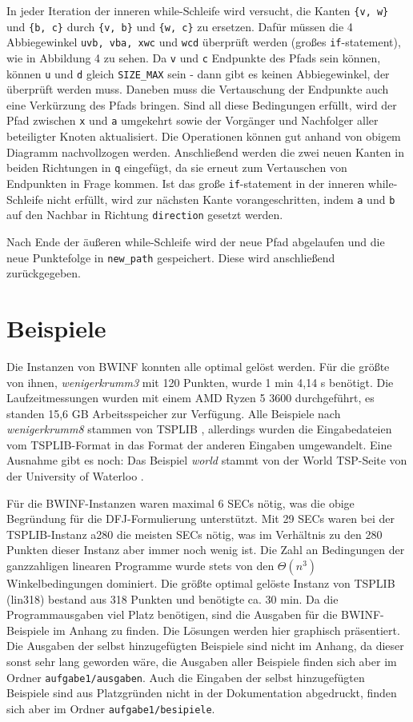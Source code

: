 \documentclass[a4paper, 10pt, ngerman]{article}
\begin{document}
In jeder Iteration der inneren while-Schleife wird versucht, die Kanten \verb|{v, w}| und \verb|{b, c}| durch \verb|{v, b}| und \verb|{w, c}| zu ersetzen. Dafür müssen die 4 Abbiegewinkel \verb|uvb, vba, xwc| und \verb|wcd| überprüft werden (großes \verb|if|-statement), wie in Abbildung 4 zu sehen. Da \verb|v| und \verb|c| Endpunkte des Pfads sein können, können \verb|u| und \verb|d| gleich \verb|SIZE_MAX| sein - dann gibt es keinen Abbiegewinkel, der überprüft werden muss. Daneben muss die Vertauschung der Endpunkte auch eine Verkürzung des Pfads bringen. Sind all diese Bedingungen erfüllt, wird der Pfad zwischen \verb|x| und \verb|a| umgekehrt sowie der Vorgänger und Nachfolger aller beteiligter Knoten aktualisiert. Die Operationen können gut anhand von obigem Diagramm nachvollzogen werden. Anschließend werden die zwei neuen Kanten in beiden Richtungen in \verb|q| eingefügt, da sie erneut zum Vertauschen von Endpunkten in Frage kommen. Ist das große \verb|if|-statement in der inneren while-Schleife nicht erfüllt, wird zur nächsten Kante vorangeschritten, indem \verb|a| und \verb|b| auf den Nachbar in Richtung \verb|direction| gesetzt werden.

Nach Ende der äußeren while-Schleife wird der neue Pfad abgelaufen und die neue Punktefolge in \verb|new_path| gespeichert. Diese wird anschließend zurückgegeben.

\section{Beispiele}

Die Instanzen von BWINF konnten alle optimal gelöst werden. Für die größte von ihnen, \emph{wenigerkrumm3} mit 120 Punkten, wurde 1 min 4,14 s benötigt. Die Laufzeitmessungen wurden mit einem AMD Ryzen 5 3600 durchgeführt, es standen 15,6 GB Arbeitsspeicher zur Verfügung. Alle Beispiele nach \emph{wenigerkrumm8} stammen von TSPLIB \cite{tsplib}, allerdings wurden die Eingabedateien vom TSPLIB-Format in das Format der anderen Eingaben umgewandelt. Eine Ausnahme gibt es noch: Das Beispiel \emph{world} stammt von der World TSP-Seite von der University of Waterloo \cite{uwaterloo}. 

Für die BWINF-Instanzen waren maximal 6 SECs nötig, was die obige Begründung für die DFJ-Formulierung unterstützt. Mit 29 SECs waren bei der TSPLIB-Instanz a280 die meisten SECs nötig, was im Verhältnis zu den 280 Punkten dieser Instanz aber immer noch wenig ist. Die Zahl an Bedingungen der ganzzahligen linearen Programme wurde stets von den $\Theta(n^3)$ Winkelbedingungen dominiert. Die größte optimal gelöste Instanz von TSPLIB (lin318) bestand aus 318 Punkten und benötigte ca. 30 min. Da die Programmausgaben viel Platz benötigen, sind die Ausgaben für die BWINF-Beispiele im Anhang zu finden. Die Lösungen werden hier graphisch präsentiert. Die Ausgaben der selbst hinzugefügten Beispiele sind nicht im Anhang, da dieser sonst sehr lang geworden wäre, die Ausgaben aller Beispiele finden sich aber im Ordner \verb|aufgabe1/ausgaben|. Auch die Eingaben der selbst hinzugefügten Beispiele sind aus Platzgründen nicht in der Dokumentation abgedruckt, finden sich aber im Ordner \verb|aufgabe1/besipiele|.
\end{document}
